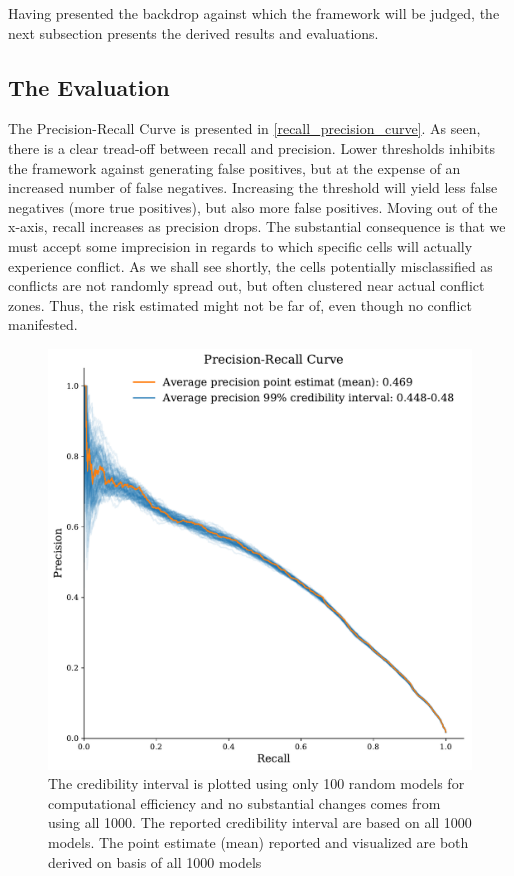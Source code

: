 \documentclass[a4paper]{article}
\begin{document}
Having presented the backdrop against which the framework will be judged, the next subsection presents the derived results and evaluations.\par

\subsection{The Evaluation}

The Precision-Recall Curve is presented in \autoref{recall_precision_curve}. As seen, there is a clear tread-off between recall and precision. Lower thresholds inhibits the framework against generating false positives, but at the expense of an increased number of false negatives. Increasing the threshold will yield less false negatives (more true positives), but also more false positives. Moving out of the x-axis, recall increases as precision drops. The substantial consequence is that we must accept some imprecision in regards to which specific cells will actually experience conflict. As we shall see shortly, the cells potentially misclassified as conflicts are not randomly spread out, but often clustered near actual conflict zones. Thus, the risk estimated might not be far of, even though no conflict manifested.\par

\begin{figure}[!htb]
	\centering
	\includegraphics[scale=0.5]{pr_curve.pdf}
    \caption{\footnotesize{The credibility interval is plotted using only 100 random models for computational efficiency and no substantial changes comes from using all 1000. The reported credibility interval are based on all 1000 models. The point estimate (mean) reported and visualized are both derived on basis of all 1000 models}}\label{recall_precision_curve}
\end{figure}
\end{document}
